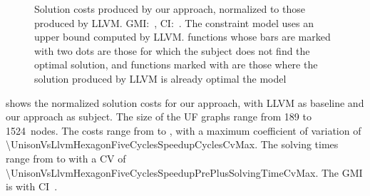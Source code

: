 

\begin{figure}
  \centering%
  \maxsizebox{\textwidth}{!}{%
    \trimBarchartPlot{%
    }%
  }

  \caption[Plot for evaluating the impact of our approach on code quality]%
          {%
            Solution costs produced by our approach, normalized to those
            produced by LLVM.
            GMI:~\printGMI{%
              \UnisonVsLlvmHexagonFiveCyclesSpeedupCyclesRegularSpeedupGmean%
            },
            CI:~\printGMICI{%
              \UnisonVsLlvmHexagonFiveCyclesSpeedupCyclesRegularSpeedupCiMin%
            }{%
              \UnisonVsLlvmHexagonFiveCyclesSpeedupCyclesRegularSpeedupCiMax%
            }.
            The constraint model uses an upper bound computed by LLVM.
            \Glspl{function} whose bars are marked with two dots are those for
            which the \gls{subject} does not find the optimal solution, and
            \glspl{function} marked with \barValueNoSolution{} are those where
            the solution produced by \gls{LLVM} is already optimal \wrt the
            model%
          }
\end{figure}

 shows the normalized \gls{solution} costs
for our approach, with \gls{LLVM} as \gls{baseline} and our approach as
\gls{subject}.
%
The size of the \glspl{UF graph} range from \num{189} to
\num{1524}~\glspl{node}.
%
The costs range from
\printCycles{\UnisonVsLlvmHexagonFiveCyclesSpeedupCyclesAvgMin} to
\printCycles{\UnisonVsLlvmHexagonFiveCyclesSpeedupCyclesAvgMax}, with a maximum
coefficient of variation of
\num{\UnisonVsLlvmHexagonFiveCyclesSpeedupCyclesCvMax}.
%
The solving times range from
\printSolvingTime{\UnisonVsLlvmHexagonFiveCyclesSpeedupPrePlusSolvingTimeAvgMin}
to
\printSolvingTime{\UnisonVsLlvmHexagonFiveCyclesSpeedupPrePlusSolvingTimeAvgMax}
with a \gls{CV} of
\num{\UnisonVsLlvmHexagonFiveCyclesSpeedupPrePlusSolvingTimeCvMax}.
%
The \gls{GMI} is \printGMI{%
  \UnisonVsLlvmHexagonFiveCyclesSpeedupCyclesRegularSpeedupGmean%
} with \gls{CI}~\printGMICI{%
  \UnisonVsLlvmHexagonFiveCyclesSpeedupCyclesRegularSpeedupCiMin%
}{%
  \UnisonVsLlvmHexagonFiveCyclesSpeedupCyclesRegularSpeedupCiMax%
}.

